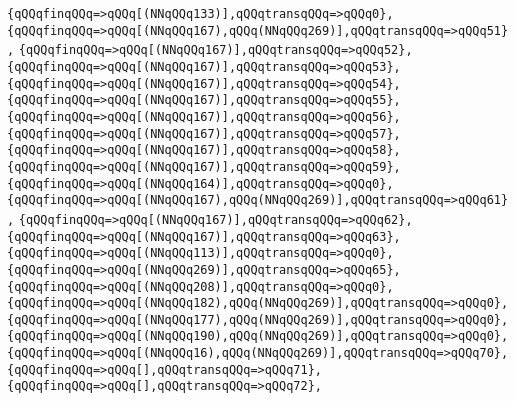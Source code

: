\verb|{qQQqfinqQQq=>qQQq[(NNqQQq133)],qQQqtransqQQq=>qQQq0},|\newline
\verb|{qQQqfinqQQq=>qQQq[(NNqQQq167),qQQq(NNqQQq269)],qQQqtransqQQq=>qQQq51},|\newline
\verb|{qQQqfinqQQq=>qQQq[(NNqQQq167)],qQQqtransqQQq=>qQQq52},|\newline
\verb|{qQQqfinqQQq=>qQQq[(NNqQQq167)],qQQqtransqQQq=>qQQq53},|\newline
\verb|{qQQqfinqQQq=>qQQq[(NNqQQq167)],qQQqtransqQQq=>qQQq54},|\newline
\verb|{qQQqfinqQQq=>qQQq[(NNqQQq167)],qQQqtransqQQq=>qQQq55},|\newline
\verb|{qQQqfinqQQq=>qQQq[(NNqQQq167)],qQQqtransqQQq=>qQQq56},|\newline
\verb|{qQQqfinqQQq=>qQQq[(NNqQQq167)],qQQqtransqQQq=>qQQq57},|\newline
\verb|{qQQqfinqQQq=>qQQq[(NNqQQq167)],qQQqtransqQQq=>qQQq58},|\newline
\verb|{qQQqfinqQQq=>qQQq[(NNqQQq167)],qQQqtransqQQq=>qQQq59},|\newline
\verb|{qQQqfinqQQq=>qQQq[(NNqQQq164)],qQQqtransqQQq=>qQQq0},|\newline
\verb|{qQQqfinqQQq=>qQQq[(NNqQQq167),qQQq(NNqQQq269)],qQQqtransqQQq=>qQQq61},|\newline
\verb|{qQQqfinqQQq=>qQQq[(NNqQQq167)],qQQqtransqQQq=>qQQq62},|\newline
\verb|{qQQqfinqQQq=>qQQq[(NNqQQq167)],qQQqtransqQQq=>qQQq63},|\newline
\verb|{qQQqfinqQQq=>qQQq[(NNqQQq113)],qQQqtransqQQq=>qQQq0},|\newline
\verb|{qQQqfinqQQq=>qQQq[(NNqQQq269)],qQQqtransqQQq=>qQQq65},|\newline
\verb|{qQQqfinqQQq=>qQQq[(NNqQQq208)],qQQqtransqQQq=>qQQq0},|\newline
\verb|{qQQqfinqQQq=>qQQq[(NNqQQq182),qQQq(NNqQQq269)],qQQqtransqQQq=>qQQq0},|\newline
\verb|{qQQqfinqQQq=>qQQq[(NNqQQq177),qQQq(NNqQQq269)],qQQqtransqQQq=>qQQq0},|\newline
\verb|{qQQqfinqQQq=>qQQq[(NNqQQq190),qQQq(NNqQQq269)],qQQqtransqQQq=>qQQq0},|\newline
\verb|{qQQqfinqQQq=>qQQq[(NNqQQq16),qQQq(NNqQQq269)],qQQqtransqQQq=>qQQq70},|\newline
\verb|{qQQqfinqQQq=>qQQq[],qQQqtransqQQq=>qQQq71},|\newline
\verb|{qQQqfinqQQq=>qQQq[],qQQqtransqQQq=>qQQq72},|\newline
